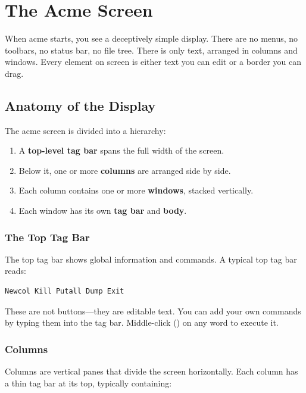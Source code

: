 \chapter{The Acme Screen}
\label{ch:screen}


When acme starts, you see a deceptively simple display.  There are no
menus, no toolbars, no status bar, no file tree.  There is only text,
arranged in columns and windows.  Every element on screen is either
text you can edit or a border you can drag.

\section{Anatomy of the Display}

The acme screen is divided into a hierarchy:

\begin{enumerate}
\item A \textbf{top-level tag bar} spans the full width of the screen.
\item Below it, one or more \textbf{columns} are arranged side by side.
\item Each column contains one or more \textbf{windows}, stacked vertically.
\item Each window has its own \textbf{tag bar} and \textbf{body}.
\end{enumerate}

\subsection{The Top Tag Bar}

The top tag bar shows global information and commands.  A typical top
tag bar reads:

\begin{Verbatim}[frame=single]
Newcol Kill Putall Dump Exit
\end{Verbatim}

These are not buttons---they are editable text.  You can add your own
commands by typing them into the tag bar.  Middle-click () on
any word to execute it.

\subsection{Columns}

Columns are vertical panes that divide the screen horizontally.  Each
column has a thin tag bar at its top, typically containing:

